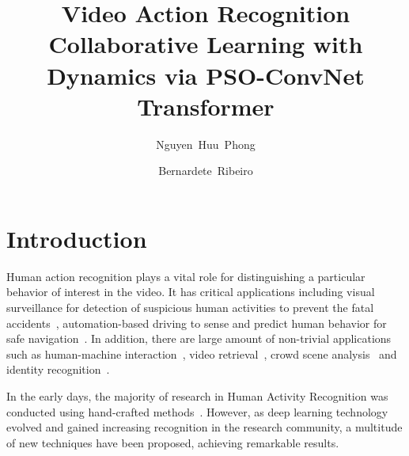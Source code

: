 \documentclass[fleqn,10pt]{wlscirep}
\title{Video Action Recognition Collaborative Learning with Dynamics via PSO-ConvNet Transformer}
\author[1,*]{Nguyen~Huu~Phong}
\author[1]{Bernardete~Ribeiro}
\affil[1]{CISUC, Department of Informatics Engineering, University of Coimbra, Coimbra, Portugal}
\affil[*]{phong@dei.uc.pt}
\begin{document}
\flushbottom
\maketitle
\thispagestyle{empty}
\setlength{\nomlabelwidth}{2.5cm}
\printnomenclature
\section*{Introduction}
Human action recognition plays a vital role for distinguishing a particular behavior of interest in the video. It has critical applications including visual surveillance for detection of suspicious human activities to prevent the fatal accidents~\cite{sultani2018real,li2020abnormal}, automation-based driving to sense and predict human behavior for safe navigation~\cite{razali2021pedestrian,yang2020driver}. In addition, there are large amount of non-trivial applications such as human-machine interaction~\cite{presti20163d,poppe2010survey}, video retrieval~\cite{zhu2017tornado}, crowd scene analysis~\cite{curtis2013right} and identity recognition~\cite{paul2014survey}.
 


In the early days, the majority of research in Human Activity Recognition was conducted using hand-crafted methods~\cite{wang2011action,wang2013action,gorelick2007actions}. However, as deep learning technology evolved and gained increasing recognition in the research community, a multitude of new techniques have been proposed, achieving remarkable results.
 
\end{document}
